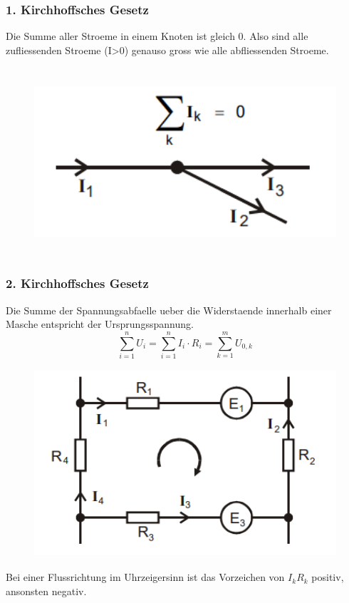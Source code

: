 \subsubsection{1. Kirchhoffsches Gesetz}
Die Summe aller Stroeme in einem Knoten ist gleich 0. Also sind alle zufliessenden Stroeme (I>0) genauso gross wie alle abfliessenden Stroeme. 
\begin{figure}[H]
    \centering
    \captionsetup{justification=centering}
    \includegraphics[height=7cm]{"Kirchhoff1_Brueckenschaltung.png"}
    \label{Fig:Kirchhoff1}
\end{figure}
\subsubsection{2. Kirchhoffsches Gesetz}
Die Summe der Spannungsabfaelle ueber die Widerstaende innerhalb einer Masche entspricht der Ursprungsspannung.
\begin{equation}
    \sum_{i=1}^n U_i=\sum_{i=1}^n I_i\cdot R_i=\sum_{k=1}^m U_{0,k}
\end{equation}
\begin{figure}[H]
    \centering
    \captionsetup{justification=centering}
    \includegraphics[height=7cm]{"Kirchhoff2_Brueckenschaltung.png"}
    \label{Fig:Kirchhoff2}
\end{figure}
Bei einer Flussrichtung im Uhrzeigersinn ist das Vorzeichen von $I_kR_k$ positiv, ansonsten negativ.
